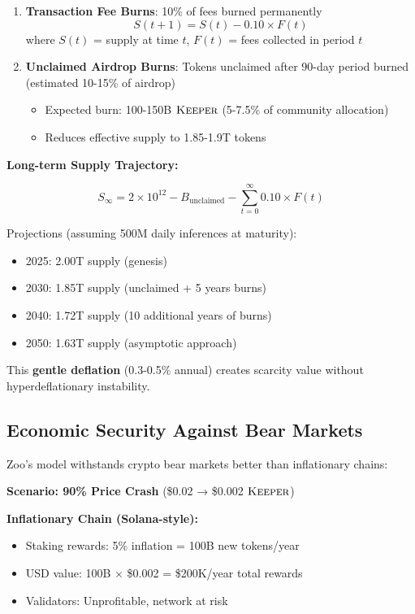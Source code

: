 \begin{enumerate}
\item \textbf{Transaction Fee Burns}: 10\% of fees burned permanently
    \begin{equation}
    S(t+1) = S(t) - 0.10 \times F(t)
    \end{equation}
    where $S(t)$ = supply at time $t$, $F(t)$ = fees collected in period $t$

\item \textbf{Unclaimed Airdrop Burns}: Tokens unclaimed after 90-day period burned (estimated 10-15\% of airdrop)
    \begin{itemize}
    \item Expected burn: 100-150B $\textsc{Keeper}$ (5-7.5\% of community allocation)
    \item Reduces effective supply to 1.85-1.9T tokens
    \end{itemize}
\end{enumerate}

\textbf{Long-term Supply Trajectory:}

\begin{equation}
S_{\infty} = 2 \times 10^{12} - B_{\text{unclaimed}} - \sum_{t=0}^{\infty} 0.10 \times F(t)
\end{equation}

Projections (assuming 500M daily inferences at maturity):
\begin{itemize}
\item 2025: 2.00T supply (genesis)
\item 2030: 1.85T supply (unclaimed + 5 years burns)
\item 2040: 1.72T supply (10 additional years of burns)
\item 2050: 1.63T supply (asymptotic approach)
\end{itemize}

This \textbf{gentle deflation} (0.3-0.5\% annual) creates scarcity value without hyperdeflationary instability.

\subsection{Economic Security Against Bear Markets}

Zoo's model withstands crypto bear markets better than inflationary chains:

\textbf{Scenario: 90\% Price Crash} (\$0.02 → \$0.002 $\textsc{Keeper}$)

\textbf{Inflationary Chain (Solana-style):}
\begin{itemize}
\item Staking rewards: 5\% inflation = 100B new tokens/year
\item USD value: 100B × \$0.002 = \$200K/year total rewards
\item Validators: Unprofitable, network at risk
\end{itemize}

